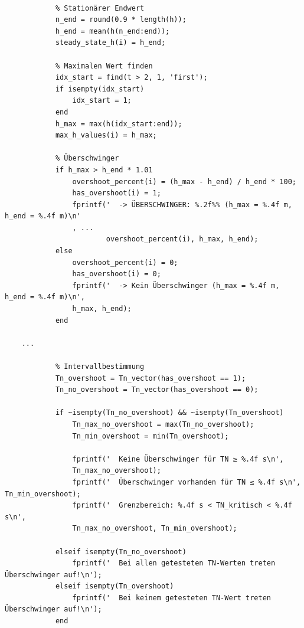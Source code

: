 \begin{sourcecode}
    \caption{\textit{Matlab}-Code zur Simulation und Berechnung der Überschwinger}
    \begin{verbatim}
        
            % Stationärer Endwert
            n_end = round(0.9 * length(h));
            h_end = mean(h(n_end:end));
            steady_state_h(i) = h_end;
            
            % Maximalen Wert finden
            idx_start = find(t > 2, 1, 'first');
            if isempty(idx_start)
                idx_start = 1;
            end
            h_max = max(h(idx_start:end));
            max_h_values(i) = h_max;
            
            % Überschwinger  
            if h_max > h_end * 1.01
                overshoot_percent(i) = (h_max - h_end) / h_end * 100;
                has_overshoot(i) = 1;
                fprintf('  -> ÜBERSCHWINGER: %.2f%% (h_max = %.4f m, h_end = %.4f m)\n'
                , ...
                        overshoot_percent(i), h_max, h_end);
            else
                overshoot_percent(i) = 0;
                has_overshoot(i) = 0;
                fprintf('  -> Kein Überschwinger (h_max = %.4f m, h_end = %.4f m)\n', 
                h_max, h_end);
            end

    ... 

            % Intervallbestimmung
            Tn_overshoot = Tn_vector(has_overshoot == 1);
            Tn_no_overshoot = Tn_vector(has_overshoot == 0);

            if ~isempty(Tn_no_overshoot) && ~isempty(Tn_overshoot)
                Tn_max_no_overshoot = max(Tn_no_overshoot);    
                Tn_min_overshoot = min(Tn_overshoot);          
                
                fprintf('  Keine Überschwinger für TN ≥ %.4f s\n', 
                Tn_max_no_overshoot);
                fprintf('  Überschwinger vorhanden für TN ≤ %.4f s\n', Tn_min_overshoot);
                fprintf('  Grenzbereich: %.4f s < TN_kritisch < %.4f s\n', 
                Tn_max_no_overshoot, Tn_min_overshoot);
                
            elseif isempty(Tn_no_overshoot)
                fprintf('  Bei allen getesteten TN-Werten treten Überschwinger auf!\n');
            elseif isempty(Tn_overshoot)
                fprintf('  Bei keinem getesteten TN-Wert treten Überschwinger auf!\n');
            end                                     
    \end{verbatim}
\label{code_2b2}
\end{sourcecode}

